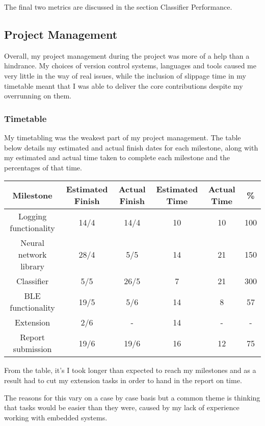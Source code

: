 \documentclass[a4paper]{article}
\begin{document}
The final two metrics are discussed in the section Classifier Performance.

\subsection{Project Management}%

Overall, my project management during the project was more of a help than a hindrance. My choices of version control systems, languages and tools caused me very little in the way of real issues, while the inclusion of slippage time in my timetable meant that I was able to deliver the core contributions despite my overrunning on them.

\subsubsection{Timetable}

My timetabling was the weakest part of my project management. The table below details my estimated and actual finish dates for each milestone, along with my estimated and actual time taken to complete each milestone and the percentages of that time.

\begin{center}
  \begin{tabular}{|c|c|c|c|c|c|}
      \hline
      Milestone & Estimated Finish & Actual Finish & Estimated Time & Actual Time & \% \\
      \hline
      Logging functionality & 14/4 & 14/4 & 10 & 10 & 100 \\
      \hline
      Neural network library & 28/4 & 5/5 & 14 & 21 & 150 \\
      \hline
      Classifier & 5/5 & 26/5 & 7 & 21 & 300 \\
      \hline
      BLE functionality & 19/5 & 5/6 & 14 & 8 & 57\\
      \hline
      Extension & 2/6 & - & 14 & - & - \\
      \hline
      Report submission & 19/6 & 19/6 & 16 & 12 & 75\\
      \hline
      \end{tabular}
\end{center}

From the table, it's I took longer than expected to reach my milestones and as a result had to cut my extension tasks in order to hand in the report on time.

The reasons for this vary on a case by case basis but a common theme is thinking that tasks would be easier than they were, caused by my lack of experience working with embedded systems.
\end{document}
